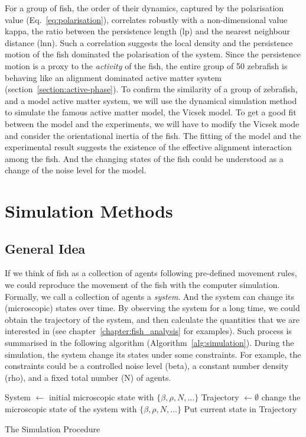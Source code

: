 \documentclass[11pt,twoside]{report}
\begin{document}
For a group of fish, the order of their dynamics, captured by the polarisation value (Eq.~\ref{eq:polarisation}), correlates robustly with a non-dimensional value \gls{kappa}, the ratio between the persistence length (\gls{lp}) and the nearest neighbour distance (\gls{lnn}).
Such a correlation suggests the local density and the persistence motion of the fish dominated the polarisation of the system.
Since the persistence motion is a proxy to the \emph{activity} of the fish, the entire group of 50 zebrafish is behaving like an alignment dominated active matter system (section~\ref{section:active-phase}).
To confirm the similarity of a group of zebrafish, and a model active matter system, we will use the dynamical simulation method to simulate the famous active matter model, the Vicsek model.
To get a good fit between the model and the experiments, we will have to modify the Vicsek mode and consider the orientational inertia of the fish.
The fitting of the model and the experimental result suggests the existence of the effective alignment interaction among the fish. And the changing states of the fish could be understood as a change of the noise level for the model.


\section{Simulation Methods}


\subsection{General Idea}

If we think of fish as a collection of agents following pre-defined movement rules, we could reproduce the movement of the fish with the computer simulation. Formally, we call a collection of agents a \emph{system}. And the system can change its (microscopic) states over time.
By observing the system for a long time, we could obtain the trajectory of the system, and then calculate the quantities that we are interested in (see chapter~\ref{chapter:fish_analysis} for examples). Such process is summarised in the following algorithm (Algorithm~\ref{alg:simulation}).
During the simulation, the system change its states under some constraints. For example, the constraints could be a controlled noise level (\gls{beta}), a constant number density (\gls{rho}), and a fixed total number (\gls{N}) of agents.


\begin{algorithm}
	System $\gets$ initial microscopic state with $\{ \beta, \rho, N, \dots \}$\;
	Trajectory $\gets \emptyset$\;
	 {
		change the microscopic state of the system with $\{ \beta, \rho, N, \dots \}$\;
		Put current state in Trajectory\;
	}
\caption{The Simulation Procedure}
\label{alg:simulation}
\end{algorithm}
\end{document}
